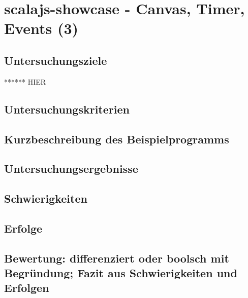 \documentclass[a4paper, 12pt, listof=totoc, bibliography=totoc]{scrreprt}
\begin{document}
\section{scalajs-showcase - Canvas, Timer, Events (3)}

\subsection{Untersuchungsziele}

****** HIER


\subsection{Untersuchungskriterien}
\subsection{Kurzbeschreibung des Beispielprogramms}
\subsection{Untersuchungsergebnisse}
\subsection{Schwierigkeiten}
\subsection{Erfolge}
\subsection{Bewertung: differenziert oder boolsch mit Begründung; Fazit aus Schwierigkeiten und Erfolgen}
\end{document}
